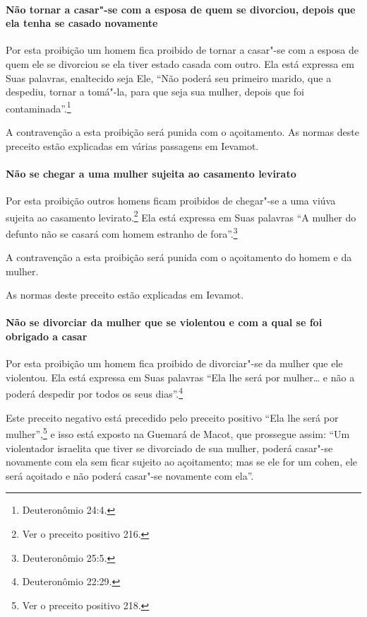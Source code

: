 \begin{multicols}{2}
\paragraph{Não tornar a casar"-se com a esposa de quem se divorciou, depois que
ela tenha se casado novamente}

Por esta proibição um homem fica proibido de tornar a casar"-se com a
esposa de quem ele se divorciou se ela tiver estado casada com outro.
Ela está expressa em Suas palavras, enaltecido seja Ele, ``Não poderá
seu primeiro marido, que a despediu, tornar a tomá"-la, para que seja sua
mulher, depois que foi contaminada''.\footnote{Deuteronômio 24:4.}

A contravenção a esta proibição será punida com o açoitamento. As normas
deste preceito estão explicadas em várias passagens em Ievamot\starr.

\paragraph{Não se chegar a uma mulher sujeita ao casamento levirato\starr}

Por esta proibição outros homens ficam proibidos de chegar"-se a uma
viúva sujeita ao casamento levirato\starr.\footnote{Ver o preceito positivo 216.} Ela está
expressa em Suas palavras ``A mulher do defunto não se casará com homem
estranho de fora''.\footnote{Deuteronômio 25:5.}

A contravenção a esta proibição será punida com o açoitamento do homem e
da mulher.

As normas deste preceito estão explicadas em Ievamot\starr.

\paragraph{Não se divorciar da mulher que se violentou e com a qual se foi obrigado a casar}

Por esta proibição um homem fica proibido de divorciar"-se da mulher que
ele violentou. Ela está expressa em Suas palavras ``Ela lhe será por
mulher\ldots{} e não a poderá despedir por todos os seus dias''.\footnote{Deuteronômio 22:29.}

Este preceito negativo está precedido pelo preceito positivo ``Ela lhe
será por mulher'',\footnote{Ver o preceito positivo 218.} e isso está exposto na Guemará\starr{}
de Macot\starr, que prossegue assim: ``Um violentador israelita que tiver se
divorciado de sua mulher, poderá casar"-se novamente com ela sem ficar
sujeito ao açoitamento; mas se ele for um cohen\starr, ele será açoitado e
não poderá casar"-se novamente com ela''.


\end{multicols}

